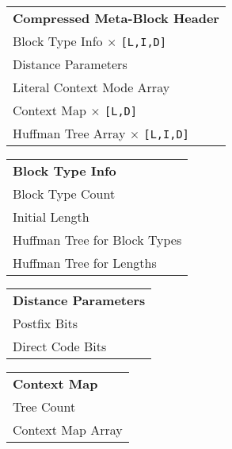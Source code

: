 \begin{tabular}{l}
	\textbf{Compressed Meta-Block Header} \\
	\addlinespace
	\hline
	\addlinespace
	Block Type Info $\times$ \verb|[L,I,D]| \\
	Distance Parameters \\
	Literal Context Mode Array \\
	Context Map $\times$ \verb|[L,D]| \\
	Huffman Tree Array $\times$ \verb|[L,I,D]| \\
\end{tabular}

\bigskip
\medskip

\begin{varwidth}[t]{\textwidth}
	\vspace{0pt}
	\centering
	
	\begin{tabular}[t]{l}
		\textbf{Block Type Info} \\
		\addlinespace
		\hline
		\addlinespace
		Block Type Count \\
		Initial Length \\
		Huffman Tree for Block Types \\
		Huffman Tree for Lengths \\
	\end{tabular}
	
\end{varwidth}%
\hspace{0.75cm}%
\begin{varwidth}[t]{\textwidth}
	\vspace{0pt}
	\centering
	
	\begin{tabular}[t]{l}
		\textbf{Distance Parameters} \\
		\addlinespace
		\hline
		\addlinespace
		Postfix Bits \\
		Direct Code Bits \\
	\end{tabular}
	
\end{varwidth}%
\hspace{0.75cm}%
\begin{varwidth}[t]{\textwidth}
	\vspace{0pt}
	\centering
	
	\begin{tabular}[t]{l}
		\textbf{Context Map} \\
		\addlinespace
		\hline
		\addlinespace
		Tree Count \\
		Context Map Array \\
	\end{tabular}
	
\end{varwidth}